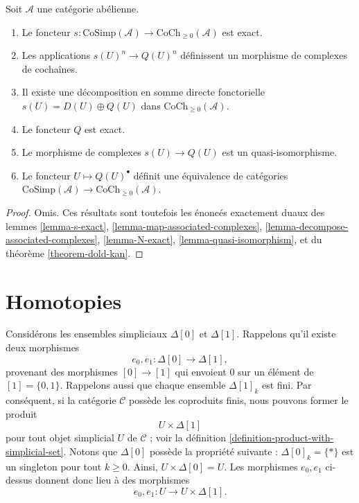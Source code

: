 \begin{lemma}
\label{lemma-dual-dold-kan}
Soit $\mathcal{A}$ une catégorie abélienne.
\begin{enumerate}
\item Le foncteur
$s : \text{CoSimp}(\mathcal{A}) \to \text{CoCh}_{\geq 0}(\mathcal{A})$
est exact.
\item Les applications $s(U)^n \to Q(U)^n$ définissent un morphisme
de complexes de cochaînes.
\item Il existe une décomposition en somme directe fonctorielle
$s(U) = D(U) \oplus Q(U)$ dans $\text{CoCh}_{\geq 0}(\mathcal{A})$.
\item Le foncteur $Q$ est exact.
\item Le morphisme de complexes $s(U) \to Q(U)$ est un quasi-isomorphisme.
\item Le foncteur $U \mapsto Q(U)^\bullet$ définit
une équivalence de catégories
$\text{CoSimp}(\mathcal{A}) \to \text{CoCh}_{\geq 0}(\mathcal{A})$.
\end{enumerate}
\end{lemma}

\begin{proof}
Omis. Ces résultats sont toutefois les énoncés exactement duaux des
lemmes \ref{lemma-s-exact}, \ref{lemma-map-associated-complexes},
\ref{lemma-decompose-associated-complexes},
\ref{lemma-N-exact}, \ref{lemma-quasi-isomorphism}, et
du théorème \ref{theorem-dold-kan}.
\end{proof}

\section{Homotopies}
\label{section-homotopy}

\noindent
Considérons les ensembles simpliciaux $\Delta[0]$ et $\Delta[1]$.
Rappelons qu'il existe deux morphismes
$$
e_0, e_1 : \Delta[0] \longrightarrow \Delta[1],
$$
provenant des morphismes $[0] \to [1]$ qui envoient
$0$ sur un élément de $[1] = \{0, 1\}$. Rappelons aussi que chaque
ensemble $\Delta[1]_k$ est fini. Par conséquent, si la catégorie
$\mathcal{C}$ possède les coproduits finis, nous pouvons
former le produit
$$
U \times \Delta[1]
$$
pour tout objet simplicial $U$ de $\mathcal{C}$ ; voir la
définition \ref{definition-product-with-simplicial-set}.
Notons que $\Delta[0]$ possède la propriété suivante : $\Delta[0]_k = \{*\}$
est un singleton pour tout $k \geq 0$. Ainsi, $U \times \Delta[0]
= U$. Les morphismes $e_0, e_1$ ci-dessus donnent donc lieu à des morphismes
$$
e_0, e_1 : U \to U \times \Delta[1].
$$

